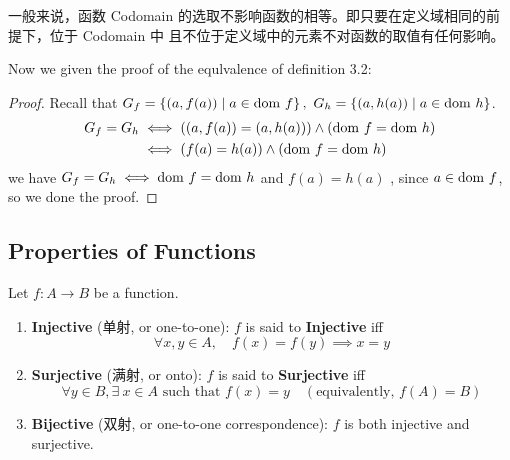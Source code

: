 \documentclass[
	UTF-8,
	11pt, %
	a4paper, %
]{LegrandOrangeBook}
\begin{document}
\begin{remark}
    一般来说，函数 Codomain 的选取不影响函数的相等。即只要在定义域相同的前提下，位于 Codomain 中
    且不位于定义域中的元素不对函数的取值有任何影响。
\end{remark}

\newpage

Now we given the proof of the equlvalence of definition 3.2:
\begin{proof} Recall that $G_f = \left\{(a, f(a)) \mid a \in \mathrm{dom}\  f\right\},\
     G_h = \left\{(a, h(a)) \mid a \in \mathrm{dom}\  h\right\}$.
    \begin{align*}
        G_f = G_h &\iff \left( (a,f(a)) = (a, h(a)) \right) \land \left( \mathrm{dom}\  f = \mathrm{dom}\  h \right)\\
                  &\iff \left( f(a) = h(a) \right) \land \left( \mathrm{dom}\  f = \mathrm{dom}\  h \right)
    \end{align*}
    we have $G_f = G_h \iff \mathrm{dom}\  f = \mathrm{dom}\  h$ and $f(a) = h(a)$ , since $a \in \mathrm{dom}\  f$, so
    we done the proof.
\end{proof}


\subsection{Properties of Functions}

\begin{definition}
Let $f: A \to B$ be a function.
\begin{enumerate}
    \item \textbf{Injective} (单射, or one-to-one): 
    $f$ is said to \textbf{Injective} iff
    \[ \forall x, y \in A, \quad f(x) = f(y) \implies x = y \]
    
    \item \textbf{Surjective} (满射, or onto): 
        $f$ is said to \textbf{Surjective} iff
    \[ \forall y \in B, \exists\ x \in A \text{ such that } f(x) = y \quad (\text{equivalently, } f(A) = B) \]
    
    \item \textbf{Bijective} (双射, or one-to-one correspondence): $f$ is both injective and surjective.
\end{enumerate}
\end{definition}
\end{document}
